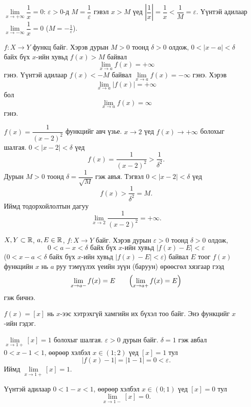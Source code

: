\begin{example}
$\lim\limits_{x\to +\infty}\dfrac{1}{x}=0$: $\varepsilon>0$-д $M=\dfrac1\varepsilon$ гэвэл $x>M$ үед
$\left|\dfrac1x\right|=\dfrac1x<\dfrac1M=\varepsilon$. Үүнтэй адилаар $\lim\limits_{x\to -\infty}\dfrac{1}{x}=0$ ($M=-\frac1\varepsilon$).
\end{example}
\begin{definition}
$f:X\to Y$ функц байг. Хэрэв дурын $M>0$ тоонд $\delta>0$ олдож, $0<|x-a|<\delta$ байх бүх $x$-ийн хувьд $f(x)>M$ байвал
\[
\lim_{x \to a} f(x) = +\infty
\]
гэнэ. Үүнтэй адилаар $f(x)<-M$ байвал $\lim\limits_{x \to a} f(x) = -\infty$ гэнэ. Хэрэв
\[
\lim_{x \to a} |f(x)| = +\infty
\]
бол
\[
\lim_{x \to a} f(x) = \infty
\]
гэнэ.
\end{definition}
\begin{example}
$f(x)=\dfrac{1}{(x-2)^2}$ функцийг авч үзье. $x\to 2$ үед $f(x)\to+\infty$ болохыг шалгая.
$0<|x-2|<\delta$ үед
\[
f(x)=\frac{1}{(x-2)^2}>\frac{1}{\delta^2}.
\]
Дурын $M>0$ тоонд $\delta=\dfrac{1}{\sqrt{M}}$ гэж авъя. Тэгвэл $0<|x-2|<\delta$ үед
\[
f(x)>\frac{1}{\delta^2}=M.
\]
Иймд тодорхойлолтын дагуу
\[
\lim_{x\to 2}\frac{1}{(x-2)^2}=+\infty.
\]
\end{example}
\begin{definition} $X, Y\subset\mathbb{R}$, $a, E\in\mathbb{R}$, $f:X\to Y$ байг.
Хэрэв дурын $\varepsilon>0$ тоонд $\delta>0$ олдож,
$$0<a-x<\delta \text{ байх бүх } x \text{-ийн хувьд } |f(x)-E|<\varepsilon$$
($0<x-a<\delta$ байх бүх $x$-ийн хувьд $|f(x)-E|<\varepsilon$)
байвал $E$ тоог $f(x)$ функцийн $x$ нь $a$ руу тэмүүлэх үеийн зүүн (баруун) өрөөсгөл хязгаар гээд
$$\lim\limits_{x\to a-}f(x)=E \qquad \Bigl(\lim\limits_{x\to a+}f(x)=E\Bigr)$$
гэж бичнэ.
\end{definition}
\begin{example}\label{Onesidedlimit}
$f(x)=[x]$ нь $x$-ээс хэтрэхгүй хамгийн их бүхэл тоо байг. Энэ функцийг $x$-ийн  гэдэг.

$\lim\limits_{x\to 1+}[x]=1$ болохыг шалгая. $\varepsilon>0$ дурын байг. $\delta=1$ гэж авбал $0<x-1<1$, өөрөөр хэлбэл
$x\in(1;2)$ үед $[x]=1$ тул
$$|f(x)-1|=|1-1|=0<\varepsilon.$$
Иймд $\lim\limits_{x\to 1+}[x]=1$.

Үүнтэй адилаар $0<1-x<1$, өөрөөр хэлбэл $x\in(0;1)$ үед $[x]=0$ тул
$$\lim\limits_{x\to 1-}[x]=0.$$
\end{example}

